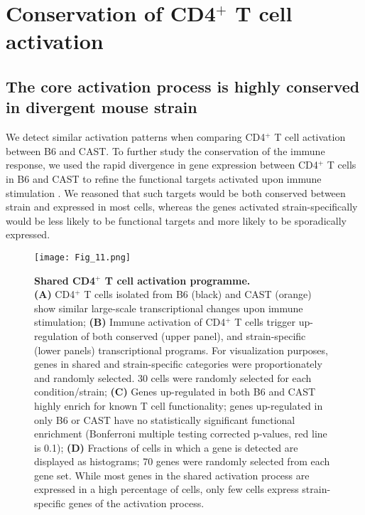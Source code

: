 \section{Conservation of CD4$^+$ T cell activation}
\subsection*{The core activation process is highly conserved in divergent mouse strain}

We detect similar activation patterns when comparing CD4$^+$ T cell activation between B6 and CAST. To further study the conservation of the immune response, we used the rapid divergence in gene expression between CD4$^+$ T cells in B6 and CAST to refine the functional targets activated upon immune stimulation \citep{Shay2013}. We reasoned that such targets would be both conserved between strain and expressed in most cells, whereas the genes activated strain-specifically would be less likely to be functional targets and more likely to be sporadically expressed.\\

\begin{figure}[!ht]
\centering
\texttt{[image: Fig\_11.png]}
\caption[Shared CD4$^+$ T cell activation programme]{\textbf{Shared CD4$^+$ T cell activation programme.}\\
\textbf{(A)} CD4$^+$ T cells isolated from B6 (black) and CAST (orange) show similar large-scale transcriptional changes upon immune stimulation; \textbf{(B)} Immune activation of CD4$^+$ T cells trigger up-regulation of both conserved (upper panel), and strain-specific (lower panels) transcriptional programs. For visualization purposes, genes in shared and strain-specific categories were proportionately and randomly selected. 30 cells were randomly selected for each condition/strain; \textbf{(C)} Genes up-regulated in both B6 and CAST highly enrich for known T cell functionality; genes up-regulated in only B6 or CAST have no statistically significant functional enrichment (Bonferroni multiple testing corrected p-values, red line is 0.1); \textbf{(D)} Fractions of cells in which a gene is detected are displayed as histograms; 70 genes were randomly selected from each gene set. While most genes in the shared activation process are expressed in a high percentage of cells, only few cells express strain-specific genes of the activation process.}
\label{fig1:shared_activation}
\end{figure}


